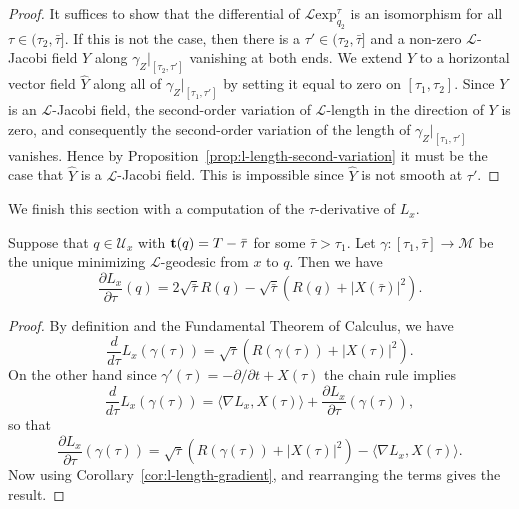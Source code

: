 \begin{proof}
\sketch
{}
It suffices to show that the differential of ${\mathcal L}\mathrm{exp}_{q_2}^\tau$ is an isomorphism for all $\tau\in
(\tau_2,\bar\tau]$. If this is not the case, then there is a
$\tau'\in (\tau_2,\bar\tau]$ and a non-zero ${\mathcal L}$-Jacobi
field $Y$ along $\gamma_Z|_{[\tau_2,\tau']}$ vanishing at both ends.
We extend $Y$ to a horizontal vector field $\widehat Y$ along all of
$\gamma_Z|_{[\tau_1,\tau']}$  by setting it equal to zero on
$[\tau_1,\tau_2]$. Since $Y$ is an ${\mathcal L}$-Jacobi field, the
second-order variation of ${\mathcal L}$-length in the direction of
$Y$ is zero, and consequently the second-order variation of the
length of $\gamma_Z|_{[\tau_1,\tau']}$ vanishes. Hence by
Proposition~\ref{prop:l-length-second-variation} it must be the case that $\widehat Y$ is a
${\mathcal L}$-Jacobi field. This is impossible since $\widehat Y$
is not smooth at $\tau'$.
\end{proof}



We finish this section with a computation of the $\tau$-derivative
of $L_x$.

\begin{lemma}\label{lem:l-length-tau-derivative}
\label{Ltau}
 Suppose that
$q\in  {\mathcal U}_x$ with ${\bf t}(q)=T-\bar\tau$ for some $\bar\tau>\tau_1$.
Let $\gamma\colon [\tau_1,\bar\tau]\to {\mathcal M}$ be the unique minimizing
${\mathcal L}$-geodesic from $x$ to $q$. Then we have
\begin{equation}\label{Ltaueqn}
\frac{\partial L_x}{\partial \tau}(q)=2\sqrt{\bar\tau}R(
q)-\sqrt{\bar\tau}\left(R( q)+|X(\bar\tau)|^2\right).
\end{equation}
\end{lemma}


\begin{proof}
\sketch
{}
By definition and the Fundamental Theorem of Calculus, we have
$$\frac{d}{d\tau}L_x(\gamma(\tau))= \sqrt{\tau}\left(R(\gamma(\tau))+|X(\tau)|^2\right).$$
On the other hand since $\gamma'(\tau)=-\partial/\partial t+X(\tau)$
the chain rule implies
$$\frac{d}{d\tau}L_x(\gamma(\tau))=\langle \nabla
L_x,X(\tau)\rangle+\frac{\partial L_x}{\partial
\tau}(\gamma(\tau)),$$ so that
$$\frac{\partial L_x}{\partial \tau}(\gamma(\tau))=\sqrt{\tau}\left(R(\gamma(\tau))+|X(\tau)|^2\right)-\langle\nabla
L_x,X(\tau)\rangle.$$ Now using Corollary~\ref{cor:l-length-gradient}, and rearranging
the terms gives the result.
\end{proof}



